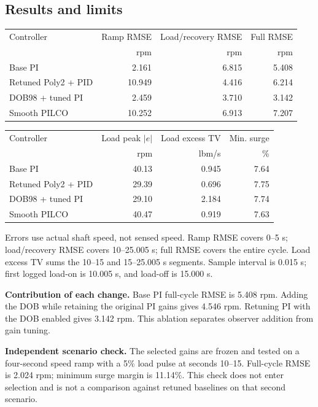 \subsection{Results and limits}
\begin{center}\small\begin{tabular}{lrrr}\toprule Controller & Ramp RMSE & Load/recovery RMSE & Full RMSE\\ & rpm & rpm & rpm\\\midrule
Base PI & 2.161 & 6.815 & 5.408 \\
Retuned Poly2 + PID & 10.949 & 4.416 & 6.214 \\
DOB98 + tuned PI & 2.459 & 3.710 & 3.142 \\
Smooth PILCO & 10.252 & 6.913 & 7.207 \\
\bottomrule\end{tabular}\end{center}
\begin{center}\small\begin{tabular}{lrrr}\toprule Controller & Load peak $|e|$ & Load excess TV & Min. surge\\ & rpm & lbm/s & \%\\\midrule
Base PI & 40.13 & 0.945 & 7.64 \\
Retuned Poly2 + PID & 29.39 & 0.696 & 7.75 \\
DOB98 + tuned PI & 29.10 & 2.184 & 7.74 \\
Smooth PILCO & 40.47 & 0.919 & 7.63 \\
\bottomrule\end{tabular}\end{center}
Errors use actual shaft speed, not sensed speed. Ramp RMSE covers 0--5 s; load/recovery RMSE covers 10--25.005 s; full RMSE covers the entire cycle. Load excess TV sums the 10--15 and 15--25.005 s segments. Sample interval is 0.015 s; first logged load-on is 10.005 s, and load-off is 15.000 s.

\textbf{Contribution of each change.} Base PI full-cycle RMSE is 5.408 rpm. Adding the DOB while retaining the original PI gains gives 4.546 rpm. Retuning PI with the DOB enabled gives 3.142 rpm. This ablation separates observer addition from gain tuning.

\textbf{Independent scenario check.} The selected gains are frozen and tested on a four-second speed ramp with a 5\% load pulse at seconds 10--15. Full-cycle RMSE is 2.024 rpm; minimum surge margin is 11.14\%. This check does not enter selection and is not a comparison against retuned baselines on that second scenario.

